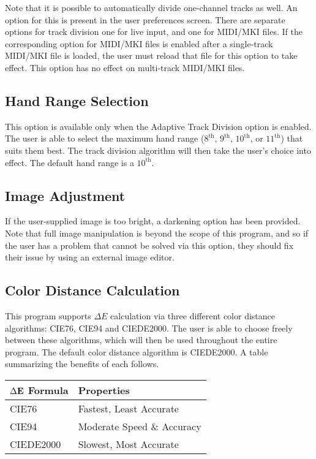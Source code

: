 \documentclass[english]{article}
\makeatletter
\newenvironment{restoretext}%
    {\@parboxrestore%
     \begin{adjustwidth}{}{\leftmargin}%
    }{\end{adjustwidth}
     }
\def\rcbegin{\begin{restoretext}\centering}
\def\rcend{\end{restoretext}}
\makeatother
\begin{document}
Note that it is possible to automatically divide one-channel tracks as well. An option for this is present in the user
preferences screen. There are separate options for track division \textendash{} one for live input, and one for MIDI/MKI files.
If the corresponding option for MIDI/MKI files is enabled after a single-track MIDI/MKI file is loaded, the user must reload
that file for this option to take effect. This option has no effect on multi-track MIDI/MKI files.

\subsection{Hand Range Selection}

This option is available only when the Adaptive Track Division option is enabled. The user is able to select the 
maximum hand range ($8^\text{th}$, $9^\text{th}$, $10^\text{th}$, or $11^\text{th}$) that suits them best. The 
track division algorithm will then take the user's choice into effect. The default hand range is a $10^\text{th}$.

\subsection{Image Adjustment}

If the user-supplied image is too bright, a darkening option has been provided. Note that full image manipulation is
beyond the scope of this program, and so if the user has a problem that cannot be solved via this option, they
should fix their issue by using an external image editor.

\subsection{Color Distance Calculation}

This program supports $\Delta E$ calculation via three different color distance algorithms: CIE76, CIE94 and CIEDE2000.
The user is able to choose freely between these algorithms, which will then be used throughout the entire program. The
default color distance algorithm is CIEDE2000. A table summarizing the benefits of each follows.

\vspace{1em}

\rcbegin
\begin{tabular}{|l|l|}
  \hline
  $\Delta\bf{E}$\textbf{ Formula}   & \textbf{Properties} \\
  \hline
  CIE76                             & Fastest, Least Accurate\\
  CIE94                             & Moderate Speed \& Accuracy\\
  CIEDE2000                         & Slowest, Most Accurate\\
  \hline
\end{tabular}
\rcend
\end{document}
